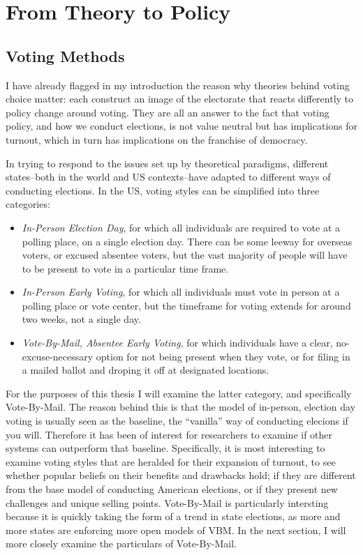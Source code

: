 \documentclass[12pt,twoside]{reedthesis}
\begin{document}
  \section{From Theory to Policy}\label{from-theory-to-policy}
  
  \subsection{Voting Methods}\label{voting-methods}
  
  I have already flagged in my introduction the reason why theories behind
  voting choice matter: each construct an image of the electorate that
  reacts differently to policy change around voting. They are all an
  answer to the fact that voting policy, and how we conduct elections, is
  not value neutral but has implications for turnout, which in turn has
  implications on the franchise of democracy.
  
  In trying to respond to the issues set up by theoretical paradigms,
  different states--both in the world and US contexts--have adapted to
  different ways of conducting elections. In the US, voting styles can be
  simplified into three categories:
  
  \begin{itemize}
  \item
    \emph{In-Person Election Day}, for which all individuals are required
    to vote at a polling place, on a single election day. There can be
    some leeway for overseas voters, or excused absentee voters, but the
    vast majority of people will have to be present to vote in a
    particular time frame.
  \item
    \emph{In-Person Early Voting}, for which all individuals must vote in
    person at a polling place or vote center, but the timeframe for voting
    extends for around two weeks, not a single day.
  \item
    \emph{Vote-By-Mail, Absentee Early Voting}, for which individuals have
    a clear, no-excuse-necessary option for not being present when they
    vote, or for filing in a mailed ballot and droping it off at
    designated locations.
  \end{itemize}
  
  For the purposes of this thesis I will examine the latter category, and
  specifically Vote-By-Mail. The reason behind this is that the model of
  in-person, election day voting is usually seen as the baseline, the
  ``vanilla'' way of conducting elecions if you will. Therefore it has
  been of interest for researchers to examine if other systems can
  outperform that baseline. Specifically, it is most interesting to
  examine voting styles that are heralded for their expansion of turnout,
  to see whether popular beliefs on their benefits and drawbacks hold; if
  they are different from the base model of conducting American elections,
  or if they present new challenges and unique selling points.
  Vote-By-Mail is particularly intersting because it is quickly taking the
  form of a trend in state elections, as more and more states are
  enforcing more open models of VBM. In the next section, I will more
  closely examine the particulars of Vote-By-Mail.
  
\end{document}
